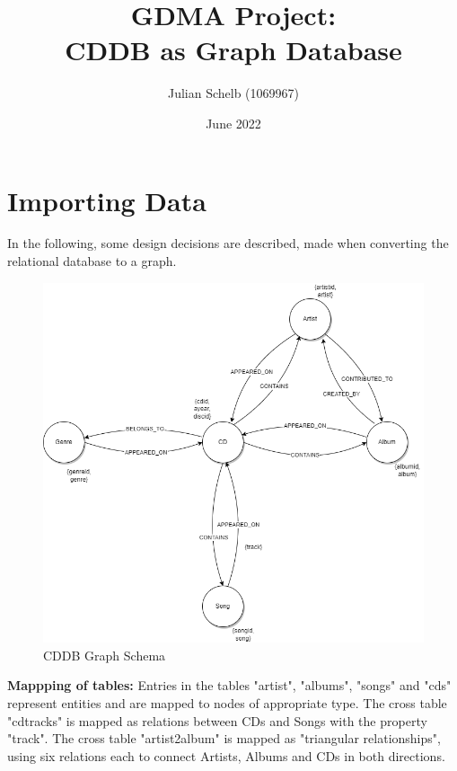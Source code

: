 \documentclass{article}
\title{GDMA Project: \\ CDDB as Graph Database}
\author{Julian Schelb (1069967)}
\date{June 2022}
\begin{document}
\maketitle

\section{Importing Data}

In the following, some design decisions are described, made when converting the relational database to a graph.



\begin{figure}[ht]
    \centering
    \includegraphics[width=11.5cm]{../Figures/cddb_as_graph-Default.png}
    \caption{CDDB Graph Schema }
\end{figure}



%     

\vspace*{2mm}
\noindent
\textbf{Mappping of tables:} Entries in the tables "artist", "albums", "songs" and "cds" represent entities and are mapped to nodes of appropriate type. The cross table "cdtracks" is mapped as relations between CDs and Songs with the property "track". The cross table "artist2album" is mapped as "triangular relationships", using six relations each to connect Artists, Albums and CDs in both directions.
\end{document}
